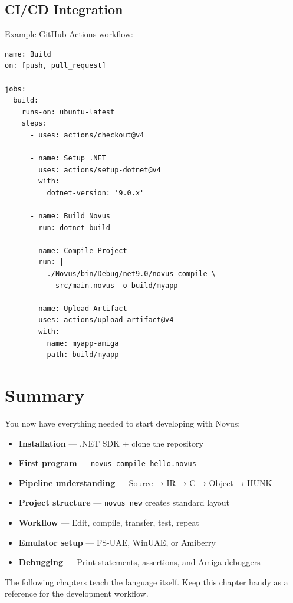 \subsection{CI/CD Integration}

Example GitHub Actions workflow:

\begin{lstlisting}[style=plain]
name: Build
on: [push, pull_request]

jobs:
  build:
    runs-on: ubuntu-latest
    steps:
      - uses: actions/checkout@v4

      - name: Setup .NET
        uses: actions/setup-dotnet@v4
        with:
          dotnet-version: '9.0.x'

      - name: Build Novus
        run: dotnet build

      - name: Compile Project
        run: |
          ./Novus/bin/Debug/net9.0/novus compile \
            src/main.novus -o build/myapp

      - name: Upload Artifact
        uses: actions/upload-artifact@v4
        with:
          name: myapp-amiga
          path: build/myapp
\end{lstlisting}

\section{Summary}
\label{sec:getting-started-summary}

You now have everything needed to start developing with Novus:

\begin{itemize}
    \item \textbf{Installation} --- .NET SDK + clone the repository
    \item \textbf{First program} --- \texttt{novus compile hello.novus}
    \item \textbf{Pipeline understanding} --- Source → IR → C → Object → HUNK
    \item \textbf{Project structure} --- \texttt{novus new} creates standard layout
    \item \textbf{Workflow} --- Edit, compile, transfer, test, repeat
    \item \textbf{Emulator setup} --- FS-UAE, WinUAE, or Amiberry
    \item \textbf{Debugging} --- Print statements, assertions, and Amiga debuggers
\end{itemize}

The following chapters teach the language itself. Keep this chapter handy as a reference for the development workflow.
